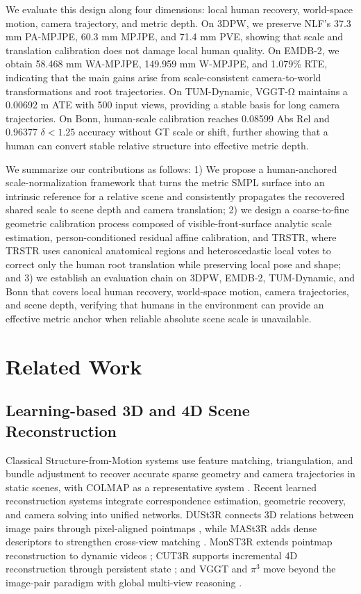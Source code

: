 \documentclass{article}
\begin{document}
We evaluate this design along four dimensions: local human recovery, world-space motion, camera trajectory, and metric depth. On 3DPW, we preserve NLF's 37.3 mm PA-MPJPE, 60.3 mm MPJPE, and 71.4 mm PVE, showing that scale and translation calibration does not damage local human quality. On EMDB-2, we obtain 58.468 mm WA-MPJPE, 149.959 mm W-MPJPE, and 1.079\% RTE, indicating that the main gains arise from scale-consistent camera-to-world transformations and root trajectories. On TUM-Dynamic, VGGT-Ω maintains a 0.00692 m ATE with 500 input views, providing a stable basis for long camera trajectories. On Bonn, human-scale calibration reaches 0.08599 Abs Rel and 0.96377 $\delta<1.25$ accuracy without GT scale or shift, further showing that a human can convert stable relative structure into effective metric depth.

We summarize our contributions as follows: 1) We propose a human-anchored scale-normalization framework that turns the metric SMPL surface into an intrinsic reference for a relative scene and consistently propagates the recovered shared scale to scene depth and camera translation; 2) we design a coarse-to-fine geometric calibration process composed of visible-front-surface analytic scale estimation, person-conditioned residual affine calibration, and TRSTR, where TRSTR uses canonical anatomical regions and heteroscedastic local votes to correct only the human root translation while preserving local pose and shape; and 3) we establish an evaluation chain on 3DPW, EMDB-2, TUM-Dynamic, and Bonn that covers local human recovery, world-space motion, camera trajectories, and scene depth, verifying that humans in the environment can provide an effective metric anchor when reliable absolute scene scale is unavailable.

\section{Related Work}\label{sec:related-work}

\subsection{Learning-based 3D and 4D Scene Reconstruction}

Classical Structure-from-Motion systems use feature matching, triangulation, and bundle adjustment to recover accurate sparse geometry and camera trajectories in static scenes, with COLMAP as a representative system \citep{schonberger2016colmap}. Recent learned reconstruction systems integrate correspondence estimation, geometric recovery, and camera solving into unified networks. DUSt3R connects 3D relations between image pairs through pixel-aligned pointmaps \citep{wang2024dust3r}, while MASt3R adds dense descriptors to strengthen cross-view matching \citep{leroy2024mast3r}. MonST3R extends pointmap reconstruction to dynamic videos \citep{zhang2024monst3r}; CUT3R supports incremental 4D reconstruction through persistent state \citep{wang2025cut3r}; and VGGT and $\pi^3$ move beyond the image-pair paradigm with global multi-view reasoning \citep{wang2025vggt,wang2025pi3}.
\end{document}
